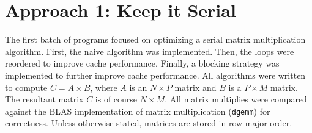 \documentclass{article}
\begin{document}
\section{Approach 1: Keep it Serial}
The first batch of programs focused on optimizing a serial matrix multiplication algorithm.
First, the naive algorithm was implemented. Then, the loops were reordered to improve cache performance.
Finally, a blocking strategy was implemented to further improve cache performance. All 
algorithms were written to compute $C = A \times B$, where $A$ is an $N \times P$ 
matrix and $B$ is a $P \times M$ matrix. The resultant matrix $C$ is of course $N \times M$. 
All matrix multiplies were compared against the BLAS implementation of matrix multiplication 
(\texttt{dgemm}) for correctness. Unless otherwise stated, matrices are stored in row-major order.
\end{document}
